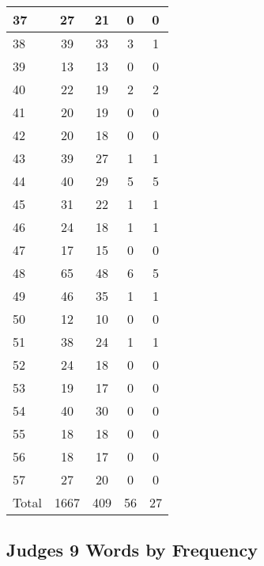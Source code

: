\begin{center}
\begin{longtable}{l|c|c|c|c}
37 & 27 & 21 & 0 & 0\\ \hline
38 & 39 & 33 & 3 & 1\\ \hline
39 & 13 & 13 & 0 & 0\\ \hline
40 & 22 & 19 & 2 & 2\\ \hline
41 & 20 & 19 & 0 & 0\\ \hline
42 & 20 & 18 & 0 & 0\\ \hline
43 & 39 & 27 & 1 & 1\\ \hline
44 & 40 & 29 & 5 & 5\\ \hline
45 & 31 & 22 & 1 & 1\\ \hline
46 & 24 & 18 & 1 & 1\\ \hline
47 & 17 & 15 & 0 & 0\\ \hline
48 & 65 & 48 & 6 & 5\\ \hline
49 & 46 & 35 & 1 & 1\\ \hline
50 & 12 & 10 & 0 & 0\\ \hline
51 & 38 & 24 & 1 & 1\\ \hline
52 & 24 & 18 & 0 & 0\\ \hline
53 & 19 & 17 & 0 & 0\\ \hline
54 & 40 & 30 & 0 & 0\\ \hline
55 & 18 & 18 & 0 & 0\\ \hline
56 & 18 & 17 & 0 & 0\\ \hline
57 & 27 & 20 & 0 & 0\\ \hline
Total & 1667 & 409 & 56 & 27
\end{longtable}
\end{center}





\subsection{Judges 9 Words by Frequency}


\normalsize
 

